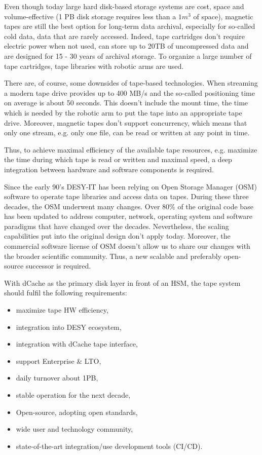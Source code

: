 \documentclass{webofc}
\begin{document}
Even though today large hard disk-based storage systems are cost, space and volume-effective (1 PB disk storage requires less than a ${1m^{3}}$ of space),
magnetic tapes are still the best option for long-term data archival, especially for so-called cold data, data that are rarely accessed.
Indeed, tape cartridges don't require electric power when not used, can store up to 20TB of uncompressed data and are designed for
15 - 30 years of archival storage. To organize a large number of tape cartridges, tape libraries with robotic arms are used.

There are, of course, some downsides of tape-based technologies. When streaming a modern tape drive provides up to 400 MB/s
and the so-called positioning time on average is about 50 seconds. This doesn't include the mount time, the time which is needed by the
robotic arm to put the tape into an appropriate tape drive. Moreover, magnetic tapes don't support concurrency, which means that only
one stream, e.g. only one file, can be read or written at any point in time.

Thus, to achieve maximal efficiency of the available tape resources, e.g. maximize the time during which tape is read or written and
maximal speed, a deep integration between hardware and software components is required.

Since the early 90's DESY-IT has been relying on Open Storage Manager (OSM) software to operate tape libraries and access data on tapes\cite{osm_desy}.
During these three decades, the OSM underwent many changes. Over 80\% of the original code base has been updated to address computer, network,
operating system and software paradigms that have changed over the decades. Nevertheless, the scaling capabilities put into the original design
don't apply today. Moreover, the commercial software license of OSM doesn't allow us to share our changes with the broader scientific community.
Thus, a new scalable and preferably open-source successor is required.

With dCache as the primary disk layer in front of an HSM, the tape system should fulfil the following requirements:

\begin{itemize}
    \item maximize tape HW efficiency,
    \item integration into DESY ecosystem,
    \item integration with dCache tape interface,
    \item support Enterprise \& LTO,
    \item daily turnover about 1PB,
    \item stable operation for the next decade,
    \item Open-source, adopting open standards,
    \item wide user and technology community,
    \item state-of-the-art integration/use development tools (CI/CD).
\end{itemize}
\end{document}
